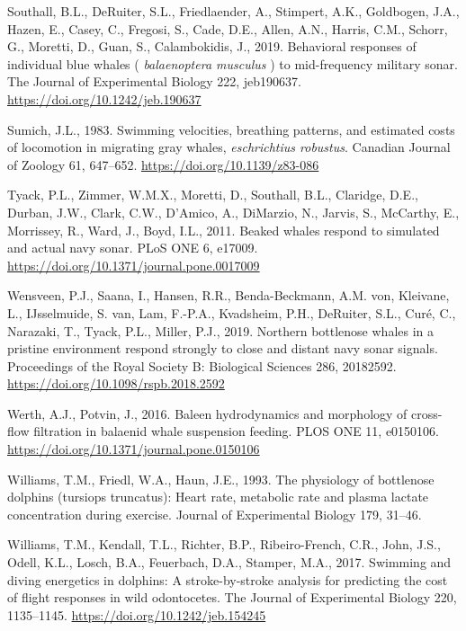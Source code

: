 \documentclass[]{elsarticle} %
\begin{document}
\hypertarget{ref-southall_behavioral_2019}{}
Southall, B.L., DeRuiter, S.L., Friedlaender, A., Stimpert, A.K.,
Goldbogen, J.A., Hazen, E., Casey, C., Fregosi, S., Cade, D.E., Allen,
A.N., Harris, C.M., Schorr, G., Moretti, D., Guan, S., Calambokidis, J.,
2019. Behavioral responses of individual blue whales (
\emph{balaenoptera musculus} ) to mid-frequency military sonar. The
Journal of Experimental Biology 222, jeb190637.
\url{https://doi.org/10.1242/jeb.190637}

\hypertarget{ref-sumich_swimming_1983}{}
Sumich, J.L., 1983. Swimming velocities, breathing patterns, and
estimated costs of locomotion in migrating gray whales,
\emph{eschrichtius robustus}. Canadian Journal of Zoology 61, 647--652.
\url{https://doi.org/10.1139/z83-086}

\hypertarget{ref-tyack_beaked_2011}{}
Tyack, P.L., Zimmer, W.M.X., Moretti, D., Southall, B.L., Claridge,
D.E., Durban, J.W., Clark, C.W., D'Amico, A., DiMarzio, N., Jarvis, S.,
McCarthy, E., Morrissey, R., Ward, J., Boyd, I.L., 2011. Beaked whales
respond to simulated and actual navy sonar. PLoS ONE 6, e17009.
\url{https://doi.org/10.1371/journal.pone.0017009}

\hypertarget{ref-wensveen_northern_2019}{}
Wensveen, P.J., Saana, I., Hansen, R.R., Benda-Beckmann, A.M. von,
Kleivane, L., IJsselmuide, S. van, Lam, F.-P.A., Kvadsheim, P.H.,
DeRuiter, S.L., Curé, C., Narazaki, T., Tyack, P.L., Miller, P.J., 2019.
Northern bottlenose whales in a pristine environment respond strongly to
close and distant navy sonar signals. Proceedings of the Royal Society
B: Biological Sciences 286, 20182592.
\url{https://doi.org/10.1098/rspb.2018.2592}

\hypertarget{ref-werth_baleen_2016}{}
Werth, A.J., Potvin, J., 2016. Baleen hydrodynamics and morphology of
cross-flow filtration in balaenid whale suspension feeding. PLOS ONE 11,
e0150106. \url{https://doi.org/10.1371/journal.pone.0150106}

\hypertarget{ref-williams_physiology_1993}{}
Williams, T.M., Friedl, W.A., Haun, J.E., 1993. The physiology of
bottlenose dolphins (tursiops truncatus): Heart rate, metabolic rate and
plasma lactate concentration during exercise. Journal of Experimental
Biology 179, 31--46.

\hypertarget{ref-williams_swimming_2017}{}
Williams, T.M., Kendall, T.L., Richter, B.P., Ribeiro-French, C.R.,
John, J.S., Odell, K.L., Losch, B.A., Feuerbach, D.A., Stamper, M.A.,
2017. Swimming and diving energetics in dolphins: A stroke-by-stroke
analysis for predicting the cost of flight responses in wild
odontocetes. The Journal of Experimental Biology 220, 1135--1145.
\url{https://doi.org/10.1242/jeb.154245}
\end{document}
